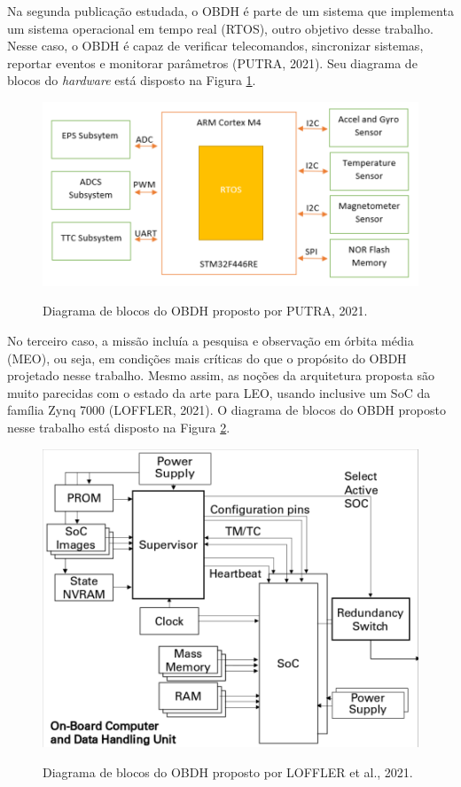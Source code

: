Na segunda publicação estudada, o OBDH é parte de um sistema que implementa um sistema operacional em tempo real (RTOS), outro objetivo desse trabalho. Nesse caso, o OBDH é capaz de verificar telecomandos, sincronizar sistemas, reportar eventos e monitorar parâmetros (PUTRA, 2021). Seu diagrama de blocos do \textit{hardware} está disposto na Figura \ref{fig:putra}.

\begin{figure}[H]
    \centering
    \caption{Diagrama de blocos do OBDH proposto por PUTRA, 2021.}
    \includegraphics[scale=0.8]{images/putra.png}
    \label{fig:putra}
\end{figure}

No terceiro caso, a missão incluía a pesquisa e observação em órbita média (MEO), ou seja, em condições mais críticas do que o propósito do OBDH projetado nesse trabalho. Mesmo assim, as noções da arquitetura proposta são muito parecidas com o estado da arte para LEO, usando inclusive um SoC da família Zynq 7000 (LOFFLER, 2021). O diagrama de blocos do OBDH proposto nesse trabalho está disposto na Figura \ref{fig:loffler}.

\begin{figure}[H]
    \centering
    \caption{Diagrama de blocos do OBDH proposto por LOFFLER et al., 2021.}
    \includegraphics[scale=0.8]{images/loffler.png}
    \label{fig:loffler}
\end{figure}

